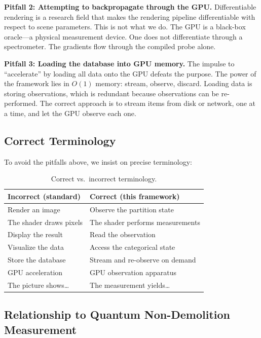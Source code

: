 \documentclass[11pt,twocolumn,a4paper]{article}
\theoremstyle{definition}
\theoremstyle{remark}
\begin{document}
\textbf{Pitfall 2: Attempting to backpropagate through the GPU.} Differentiable rendering is a research field that makes the rendering pipeline differentiable with respect to scene parameters. This is not what we do. The GPU is a black-box oracle---a physical measurement device. One does not differentiate through a spectrometer. The gradients flow through the compiled probe alone.

\textbf{Pitfall 3: Loading the database into GPU memory.} The impulse to ``accelerate'' by loading all data onto the GPU defeats the purpose. The power of the framework lies in $O(1)$ memory: stream, observe, discard. Loading data is storing observations, which is redundant because observations can be re-performed. The correct approach is to stream items from disk or network, one at a time, and let the GPU observe each one.

\subsection{Correct Terminology}

To avoid the pitfalls above, we insist on precise terminology:

\begin{table}[H]
\centering
\caption{Correct vs.\ incorrect terminology.}
\label{tab:terminology}
\begin{tabular}{@{}ll@{}}
\toprule
\textbf{Incorrect (standard)} & \textbf{Correct (this framework)} \\
\midrule
Render an image & Observe the partition state \\
The shader draws pixels & The shader performs measurements \\
Display the result & Read the observation \\
Visualize the data & Access the categorical state \\
Store the database & Stream and re-observe on demand \\
GPU acceleration & GPU observation apparatus \\
The picture shows\ldots & The measurement yields\ldots \\
\bottomrule
\end{tabular}
\end{table}

\subsection{Relationship to Quantum Non-Demolition Measurement}
\end{document}
